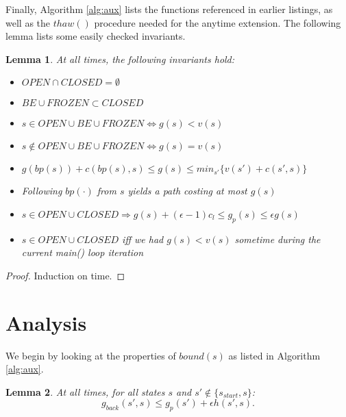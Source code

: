 \documentclass[letterpaper]{article}
\newtheorem{lemma}{Lemma}
\begin{document}
Finally, Algorithm \ref{alg:aux} lists the functions referenced in earlier listings, as well as the $thaw()$ procedure needed for the anytime extension. The following lemma lists some easily checked invariants.

\begin{lemma}
\label{lem:prop}
At all times, the following invariants hold:
\begin{itemize}
\item $OPEN\cap CLOSED = \emptyset$
\item $BE\cup FROZEN \subset CLOSED$
\item $s\in OPEN\cup BE\cup FROZEN \Leftrightarrow g(s) < v(s)$
\item $s\notin OPEN\cup BE\cup FROZEN \Leftrightarrow g(s) = v(s)$
\item $g(bp(s)) + c(bp(s),s) \le g(s) \le min_{s'}\{v(s') + c(s',s)\}$
\item Following $bp(\cdot)$ from $s$ yields a path costing at most $g(s)$
\item $s\in OPEN\cup CLOSED \Rightarrow g(s) + (\epsilon-1)c_l \le g_p(s) \le \epsilon g(s)$
\item $s\in OPEN\cup CLOSED$ iff we had $g(s)<v(s)$ sometime during the current main() loop iteration
\end{itemize}
\end{lemma}

\begin{proof}
Induction on time.
\end{proof}

\section{Analysis}

We begin by looking at the properties of $bound(s)$ as listed in Algorithm \ref{alg:aux}.

\begin{lemma}
\label{lem:indep}
At all times, for all states $s$ and $s'\notin \{s_{start},s\}$:
\[g_{back}(s',s) \le g_p(s') + \epsilon h(s',s).\]
\end{lemma}
\end{document}
